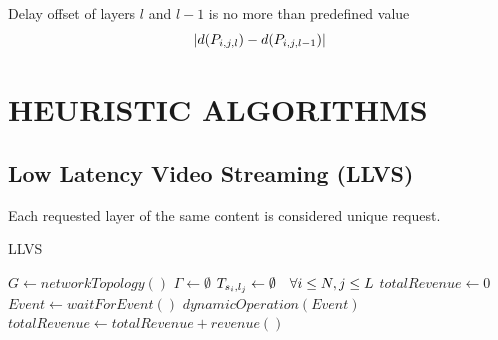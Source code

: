 \documentclass[a4paper, 10pt, conference]{ieeeconf}
\begin{document}
Delay offset of layers $l$ and $l-1$ is no more than predefined value
\begin{equation}
\lvert \dsil{\psilj{i}{j}{l}} - \dsil{\psilj{i}{j}{l-1}} \rvert %
\end{equation}


\section{HEURISTIC ALGORITHMS}
\subsection{Low Latency Video Streaming (LLVS)}

Each requested layer of the same content is considered unique request.

\newpage

\begin{algorithm}
    \caption{LLVS}\label{alg:main}
    \begin{algorithmic}[1]
        \State $G \gets networkTopology()$
        \State $\Gamma \gets \emptyset$
        \State $T_{s_i,l_j} \gets \emptyset \quad \forall i \le N, j \le  L$
        \State $totalRevenue \gets 0$
            \State $Event \gets waitForEvent()$
            \State $dynamicOperation(Event)$    
            \State $totalRevenue \gets totalRevenue+revenue()$
        \EndWhile
    \EndProcedure
    \end{algorithmic}
\end{algorithm}
\end{document}
